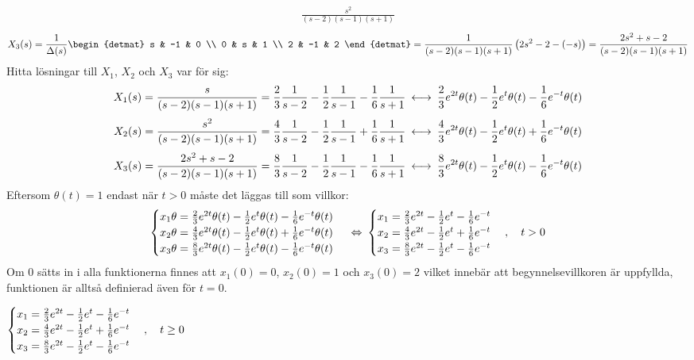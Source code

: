 \begin{task}{5.17}
\begin{align*}
	\frac{s^2}{(s-2)(s-1)(s+1)}
	\end{align*}
	\begin{align*}
	X_3(s)=
	\frac{1}{\Delta(s)}\begin{detmat}
	s & -1 & 0 \\
	0 & s & 1 \\
	2 & -1 & 2
	\end{detmat}=
	\frac{1}{(s-2)(s-1)(s+1)}\left(2s^2-2-(-s)\right)=
	\frac{2s^2+s-2}{(s-2)(s-1)(s+1)}
	\end{align*}
	Hitta lösningar till $X_1$, $X_2$ och $X_3$ var för sig: 
	\begin{align*}
	X_1(s)=
	\frac{s}{(s-2)(s-1)(s+1)}=
	\frac{2}{3}\*\frac{1}{s-2}-\frac{1}{2}\*\frac{1}{s-1}-\frac{1}{6}\*\frac{1}{s+1} \llra
	\frac{2}{3}e^{2t}\theta(t)-\frac{1}{2}e^{t}\theta(t)-\frac{1}{6}e^{-t}\theta(t)
	\end{align*}
	\begin{align*}
	X_2(s)=
	\frac{s^2}{(s-2)(s-1)(s+1)}=
	\frac{4}{3}\*\frac{1}{s-2}-\frac{1}{2}\*\frac{1}{s-1}+\frac{1}{6}\*\frac{1}{s+1} \llra
	\frac{4}{3}e^{2t}\theta(t)-\frac{1}{2}e^{t}\theta(t)+\frac{1}{6}e^{-t}\theta(t)
	\end{align*}
	\begin{align*}
	X_3(s)=
	\frac{2s^2+s-2}{(s-2)(s-1)(s+1)}=
	\frac{8}{3}\*\frac{1}{s-2}-\frac{1}{2}\*\frac{1}{s-1}-\frac{1}{6}\*\frac{1}{s+1} \llra
	\frac{8}{3}e^{2t}\theta(t)-\frac{1}{2}e^{t}\theta(t)-\frac{1}{6}e^{-t}\theta(t)
	\end{align*}
	Eftersom $\theta(t)=1$ endast när $t>0$ måste det läggas till som villkor:
	\[\begin{cases}
	x_1\theta=\frac{2}{3}e^{2t}\theta(t)-\frac{1}{2}e^{t}\theta(t)-\frac{1}{6}e^{-t}\theta(t) \\
	x_2\theta=\frac{4}{3}e^{2t}\theta(t)-\frac{1}{2}e^{t}\theta(t)+\frac{1}{6}e^{-t}\theta(t) \\
	x_3\theta=\frac{8}{3}e^{2t}\theta(t)-\frac{1}{2}e^{t}\theta(t)-\frac{1}{6}e^{-t}\theta(t)
	\end{cases} \lra
	\begin{cases}
	x_1=\frac{2}{3}e^{2t}-\frac{1}{2}e^{t}-\frac{1}{6}e^{-t} \\
	x_2=\frac{4}{3}e^{2t}-\frac{1}{2}e^{t}+\frac{1}{6}e^{-t} \\
	x_3=\frac{8}{3}e^{2t}-\frac{1}{2}e^{t}-\frac{1}{6}e^{-t}
	\end{cases}\cond{t>0}\]
	Om 0 sätts in i alla funktionerna finnes att $x_1(0)=0$, $x_2(0)=1$ och $x_3(0)=2$ vilket innebär att begynnelsevillkoren är uppfyllda, funktionen är alltså definierad även för $t=0$.
	
	\ans 
	$\begin{cases}
	x_1=\frac{2}{3}e^{2t}-\frac{1}{2}e^{t}-\frac{1}{6}e^{-t} \\
	x_2=\frac{4}{3}e^{2t}-\frac{1}{2}e^{t}+\frac{1}{6}e^{-t} \\
	x_3=\frac{8}{3}e^{2t}-\frac{1}{2}e^{t}-\frac{1}{6}e^{-t}
	\end{cases}, \quad t\ge0$
\end{task}

\begin{task}{5.18}
\end{task}